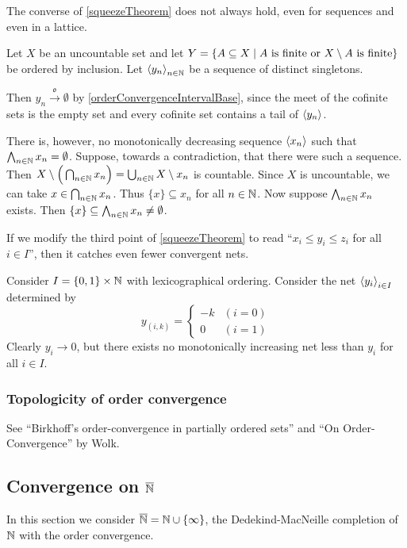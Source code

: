 \begin{example}
The converse of \ref{squeezeTheorem} does not always hold, even for sequences and even in a lattice.

Let $X$ be an uncountable set and let $Y = \setbuilder{A\subseteq X}{\text{$A$ is finite or $X\setminus A$ is finite}}$ be ordered by inclusion. Let $\left\langle y_n \right\rangle_{n\in\mathbb{N}}$ be a sequence of distinct singletons.

Then $y_n \overset{\mathfrak{o}}{\longrightarrow} \emptyset$ by \ref{orderConvergenceIntervalBase}, since the meet of the cofinite sets is the empty set and every cofinite set contains a tail of $\left\langle y_n \right\rangle$.

There is, however, no monotonically decreasing sequence $\left\langle x_n \right\rangle$ such that $\bigwedge_{n\in\mathbb{N}}x_n = \emptyset$. Suppose, towards a contradiction, that there were such a sequence. Then $X\setminus \Big(\bigcap_{n\in \mathbb{N}}x_n\Big) = \bigcup_{n\in \mathbb{N}}X\setminus x_n$ is countable. Since $X$ is uncountable, we can take $x\in \bigcap_{n\in \mathbb{N}}x_n$. Thus $\{x\}\subseteq x_n$ for all $n\in \mathbb{N}$. Now suppose $\bigwedge_{n\in \mathbb{N}}x_n$ exists. Then $\{x\}\subseteq \bigwedge_{n\in \mathbb{N}}x_n \neq \emptyset$.
\end{example}

\begin{example}
If we modify the third point of \ref{squeezeTheorem} to read ``$x_i \leq y_i \leq z_i$ for all $i\in I$'', then it catches even fewer convergent nets.

Consider $I = \{0,1\}\times\mathbb{N}$ with lexicographical ordering. Consider the net $\left\langle y_i \right\rangle_{i\in I}$ determined by
\[ y_{(i,k)} = \begin{cases}
-k & (i=0) \\
0 & (i=1)
\end{cases} \]
Clearly $y_i \to 0$, but there exists no monotonically increasing net less than $y_i$ for all $i\in I$.
\end{example}

\subsubsection{Topologicity of order convergence}
See ``Birkhoff's order-convergence in partially ordered sets'' and ``On Order-Convergence'' by Wolk.



\subsection{Convergence on $\overline{\mathbb{N}}$}
In this section we consider $\overline{\mathbb{N}} = \mathbb{N} \cup \{\infty\}$, the Dedekind-MacNeille completion of $\mathbb{N}$ with the order convergence.

